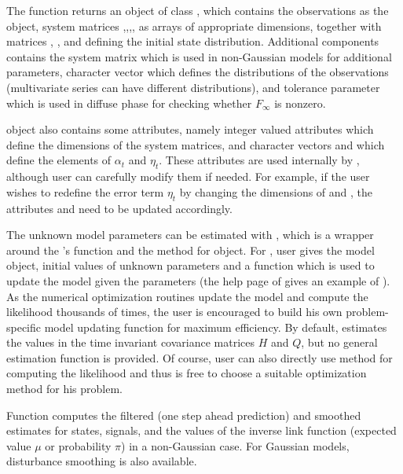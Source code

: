 \documentclass[nojss,article]{jss}\usepackage[]{graphicx}\usepackage[]{color}
\begin{document}
The function  returns an object of class , which contains the observations  as the  object, system matrices ,,,, as arrays of appropriate dimensions, together with matrices , , and  defining the initial state distribution. Additional components contains the system matrix  which is used in non-Gaussian models for additional parameters, character vector  which defines the distributions of the observations (multivariate series can have different distributions), and tolerance parameter  which is used in diffuse phase for checking whether $F_\infty$ is nonzero.

 object also contains some attributes, namely integer valued attributes  which define the dimensions of the system matrices, and character vectors  and  which define the elements of $\alpha_t$ and $\eta_t$. These attributes are used internally by , although user can carefully modify them if needed. For example, if the user wishes to redefine the error term $\eta_t$ by changing the dimensions of  and , the attributes  and  need to be updated accordingly.

The unknown model parameters can be estimated with , which is a wrapper around the 's  function and the  method for  object. For , user gives the model object, initial values of unknown parameters and a function  which is used to update the model given the parameters (the help page of  gives an example of ). As the numerical optimization routines update the model and compute the likelihood thousands of times, the user is encouraged to build his own problem-specific model updating function for maximum efficiency. By default,  estimates the  values in the time invariant covariance matrices $H$ and $Q$, but no general estimation function is provided. Of course, user can also directly use  method for computing the likelihood and thus is free to choose a suitable optimization method for his problem.

Function  computes the filtered (one step ahead prediction) and smoothed estimates for states, signals, and the values of the inverse link function (expected value $\mu$ or probability $\pi$) in a non-Gaussian case. For Gaussian models, disturbance smoothing is also available.
\end{document}

